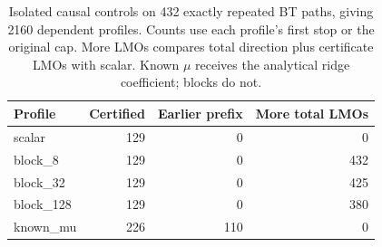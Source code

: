 \begin{table}[htbp]
\centering\small
\caption{Isolated causal controls on 432 exactly repeated BT paths, giving 2160 dependent profiles. Counts use each profile's first stop or the original cap. More LMOs compares total direction plus certificate LMOs with scalar. Known $\mu$ receives the analytical ridge coefficient; blocks do not.}
\label{tab:monitors}
\begin{tabular}{lrrr}
\toprule
Profile & Certified & Earlier prefix & More total LMOs \\
\midrule
scalar & 129 & 0 & 0 \\
block\_8 & 129 & 0 & 432 \\
block\_32 & 129 & 0 & 425 \\
block\_128 & 129 & 0 & 380 \\
known\_mu & 226 & 110 & 0 \\
\bottomrule
\end{tabular}
\end{table}
